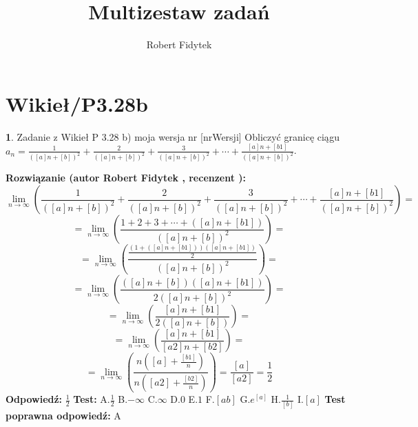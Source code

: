 \documentclass[12pt, a4paper]{article}
\title{Multizestaw zadań}
\author{Robert Fidytek}
\date{}
\theoremstyle{definition} %
\newtheorem{zad}{}
\newcommand{\kategoria}[1]{\section{#1}} %
\newcommand{\zadStart}[1]{\begin{zad}#1\newline} %
\newcommand{\zadStop}{\end{zad}}   %
\newcommand{\rozwStart}[2]{\noindent \textbf{Rozwiązanie (autor #1 , recenzent #2): }\newline} %
\newcommand{\rozwStop}{\newline}                                            %
\newcommand{\odpStart}{\noindent \textbf{Odpowiedź:}\newline}    %
\newcommand{\odpStop}{\newline}                                             %
\newcommand{\testStart}{\noindent \textbf{Test:}\newline} %
\newcommand{\testStop}{\newline} %
\newcommand{\kluczStart}{\noindent \textbf{Test poprawna odpowiedź:}\newline} %
\newcommand{\kluczStop}{\newline} %
\begin{document}
\maketitle


\kategoria{Wikieł/P3.28b}
\zadStart{Zadanie z Wikieł P 3.28 b) moja wersja nr [nrWersji]}
Obliczyć granicę ciągu $a_{n}=\frac{1}{([a]n+[b])^2}+\frac{2}{([a]n+[b])^2}+\frac{3}{([a]n+[b])^2}+\cdots+\frac{[a]n+[b1]}{([a]n+[b])^2}$.
\zadStop
\rozwStart{Robert Fidytek}{}
$$\lim\limits_{n\to\infty}\left(\frac{1}{([a]n+[b])^2}+\frac{2}{([a]n+[b])^2}+\frac{3}{([a]n+[b])^2}+\cdots+\frac{[a]n+[b1]}{([a]n+[b])^2}\right)=$$ 
$$=\lim\limits_{n\to\infty}\left(\frac{1+2+3+\cdots+([a]n+[b1])}{([a]n+[b])^2}\right)=$$ 
$$=\lim\limits_{n\to\infty}\left(\frac{\frac{(1+([a]n+[b1]))([a]n+[b1])}{2}}{([a]n+[b])^2}\right)=$$ 
$$=\lim\limits_{n\to\infty}\left(\frac{([a]n+[b])([a]n+[b1])}{2([a]n+[b])^2}\right)=$$ 
$$=\lim\limits_{n\to\infty}\left(\frac{[a]n+[b1]}{2([a]n+[b])}\right)=$$ 
$$=\lim\limits_{n\to\infty}\left(\frac{[a]n+[b1]}{[a2]n+[b2]}\right)=$$ 
$$=\lim\limits_{n\to\infty}\left(\frac{n\left([a]+\frac{[b1]}{n}\right)}{n\left([a2]+\frac{[b2]}{n}\right)}\right)=\frac{[a]}{[a2]}=\frac{1}{2}$$ 
\rozwStop
\odpStart
$\frac{1}{2}$
\odpStop
\testStart
A.$\frac{1}{2}$
B.$-\infty$
C.$\infty$
D.$0$
E.$1$
F.$[ab]$
G.$e^{[a]}$
H.$\frac{1}{[b]}$
I.$[a]$
\testStop
\kluczStart
A
\kluczStop
\end{document}
